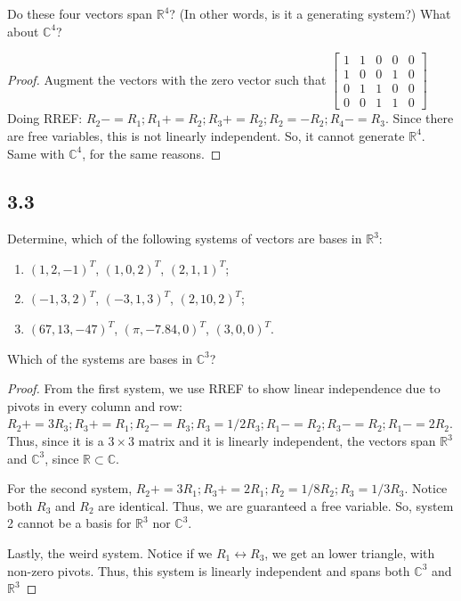 \documentclass{amsart}
\begin{document}
Do these four vectors span $\mathbb{R}^4$? (In other words, is it a generating system?) What about $\mathbb{C}^4$?

\begin{proof}
    Augment the vectors with the zero vector such that $\begin{bmatrix}
        1 &1&0&0& 0\\ 
        1&0&0&1&0 \\ 
        0&1&1&0&0 \\ 
        0&0&1&1&0
    \end{bmatrix}$
    Doing RREF: $R_2 -= R_1; R_1 += R_2; R_3 += R_2; R_2 = -R_2; R_4 -=R_3$. Since there are free variables, this is not linearly independent. So, it cannot generate $\mathbb{R}^4$. Same with $\mathbb{C}^4$, for the same reasons. 
\end{proof}
\subsection*{3.3}
Determine, which of the following systems of vectors are bases in $\mathbb{R}^3$:
\begin{enumerate}
\item[a)] $(1,2,-1)^T$, $(1,0,2)^T$, $(2,1,1)^T$;
\item[b)] $(-1,3,2)^T$, $(-3,1,3)^T$, $(2,10,2)^T$;
\item[c)] $(67,13,-47)^T$, $(\pi,-7.84,0)^T$, $(3,0,0)^T$.
\end{enumerate}
Which of the systems are bases in $\mathbb{C}^3$?

\begin{proof}
    From the first system, we use RREF to show linear independence due to pivots in every column and row: $R_2 += 3R_3; R_3 += R_1; R_2 -= R_3; R_3 = 1/2 R_3; R_1 -= R_2; R_3 -= R_2; R_1 -= 2R_2$. Thus, since it is a $3\times 3$ matrix and it is linearly independent, the vectors span $\mathbb{R}^3$ and $\mathbb{C}^3$, since $\mathbb{R} \subset \mathbb{C}$.
    
    For the second system, $R_2 += 3R_1; R_3 += 2R_1; R_2 = 1/8 R_2; R_3 = 1/3 R_3$. Notice both $R_3$ and $R_2$ are identical. Thus, we are guaranteed a free variable. So, system 2 cannot be a basis for $\mathbb{R}^3$ nor $\mathbb{C}^3$.

    Lastly, the weird system. Notice if we $R_1 \leftrightarrow R_3$, we get an lower triangle, with non-zero pivots. Thus, this system is linearly independent and spans both $\mathbb{C}^3$ and $\mathbb{R}^3$
\end{proof}
\end{document}
